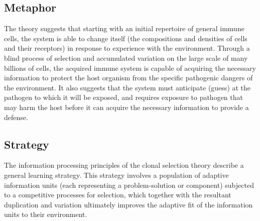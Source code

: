 \subsection{Metaphor}
The theory suggests that starting with an initial repertoire of general immune cells, the system is able to change itself (the compositions and densities of cells and their receptors) in response to experience with the environment. Through a blind process of selection and accumulated variation on the large scale of many billions of cells, the acquired immune system is capable of acquiring the necessary information to protect the host organism from the specific pathogenic dangers of the environment. It also suggests that the system must anticipate (guess) at the pathogen to which it will be exposed, and requires exposure to pathogen that may harm the host before it can acquire the necessary information to provide a defense.

\subsection{Strategy}
The information processing principles of the clonal selection theory describe a general learning strategy.
This strategy involves a population of adaptive information units (each representing a problem-solution or component) subjected to a competitive processes for selection, which together with the resultant duplication and variation ultimately improves the adaptive fit of the information units to their environment.

